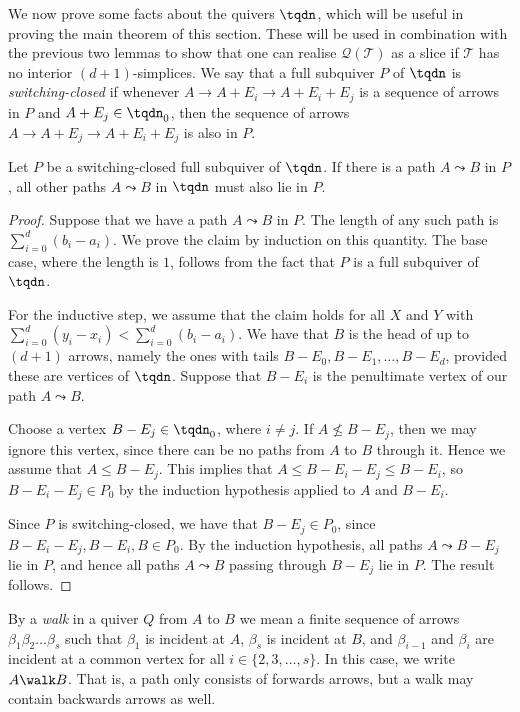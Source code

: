 We now prove some facts about the quivers $\tqdn$, which will be useful in proving the main theorem of this section. These will be used in combination with the previous two lemmas to show that one can realise $\mathcal{Q}(\mathcal{T})$ as a slice if $\mathcal{T}$ has no interior $(d + 1)$-simplices. We say that a full subquiver $P$ of $\tqdn$ is \emph{switching-closed} if whenever $A \rightarrow A + E_{i} \rightarrow A + E_{i} + E_{j}$ is a sequence of arrows in $P$ and $A + E_{j} \in \tqdn_{0}$, then the sequence of arrows $A \rightarrow A + E_{j} \rightarrow A + E_{i} + E_{j}$ is also in $P$.

\begin{lemma}\label{lem:all_paths}
Let $P$ be a switching-closed full subquiver of $\tqdn$. If there is a path $A \leadsto B$ in $P$, all other paths $A \leadsto B$ in $\tqdn$ must also lie in $P$.
\end{lemma}
\begin{proof}
Suppose that we have a path $A \leadsto B$ in $P$. The length of any such path is $\sum_{i = 0}^{d}(b_{i} - a_{i})$. We prove the claim by induction on this quantity. The base case, where the length is $1$, follows from the fact that $P$ is a full subquiver of $\tqdn$.

For the inductive step, we assume that the claim holds for all $X$ and $Y$ with $\sum_{i = 0}^{d}(y_{i} - x_{i}) < \sum_{i = 0}^{d}(b_{i} - a_{i})$. We have that $B$ is the head of up to $(d + 1)$ arrows, namely the ones with tails $B - E_{0}, B - E_{1}, \dots, B - E_{d}$, provided these are vertices of $\tqdn$. Suppose that $B - E_{i}$ is the penultimate vertex of our path $A \leadsto B$.

Choose a vertex $B - E_{j} \in \tqdn_{0}$, where $i \neq j$. If $A \not\leqslant B - E_{j}$, then we may ignore this vertex, since there can be no paths from $A$ to $B$ through it. Hence we assume that $A \leqslant B - E_{j}$. This implies that $A \leqslant B - E_{i} - E_{j} \leqslant B - E_{i}$, so $B - E_{i} - E_{j} \in P_{0}$ by the induction hypothesis applied to $A$ and $B - E_{i}$.

Since $P$ is switching-closed, we have that $B - E_{j} \in P_{0}$, since $B - E_{i} - E_{j}, B - E_{i}, B \in P_{0}$. By the induction hypothesis, all paths $A \leadsto B - E_{j}$ lie in $P$, and hence all paths $A \leadsto B$ passing through $B - E_{j}$ lie in $P$. The result follows.
\end{proof}

By a \emph{walk} in a quiver $Q$ from $A$ to $B$ we mean a finite sequence of arrows $\beta_{1}\beta_{2}\dots\beta_{s}$ such that $\beta_{1}$ is incident at $A$, $\beta_{s}$ is incident at $B$, and $\beta_{i-1}$ and $\beta_{i}$ are incident at a common vertex for all $i \in \{2, 3, \dots, s\}$. In this case, we write $A \walk B$. That is, a path only consists of forwards arrows, but a walk may contain backwards arrows as well.

